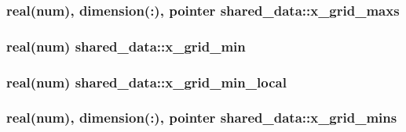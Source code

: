 \subsubsection[{\texorpdfstring{x\+\_\+grid\+\_\+maxs}{x_grid_maxs}}]{\setlength{\rightskip}{0pt plus 5cm}real(num), dimension(\+:), pointer shared\+\_\+data\+::x\+\_\+grid\+\_\+maxs}\hypertarget{namespaceshared__data_a486820ed6ed463bc8084e37890eb105e}{}\label{namespaceshared__data_a486820ed6ed463bc8084e37890eb105e}
\subsubsection[{\texorpdfstring{x\+\_\+grid\+\_\+min}{x_grid_min}}]{\setlength{\rightskip}{0pt plus 5cm}real(num) shared\+\_\+data\+::x\+\_\+grid\+\_\+min}\hypertarget{namespaceshared__data_a76d3dbdf07d1cb5aed88b436a613a6f6}{}\label{namespaceshared__data_a76d3dbdf07d1cb5aed88b436a613a6f6}
\subsubsection[{\texorpdfstring{x\+\_\+grid\+\_\+min\+\_\+local}{x_grid_min_local}}]{\setlength{\rightskip}{0pt plus 5cm}real(num) shared\+\_\+data\+::x\+\_\+grid\+\_\+min\+\_\+local}\hypertarget{namespaceshared__data_a12ab3a40a19df149a5d322939704a393}{}\label{namespaceshared__data_a12ab3a40a19df149a5d322939704a393}
\subsubsection[{\texorpdfstring{x\+\_\+grid\+\_\+mins}{x_grid_mins}}]{\setlength{\rightskip}{0pt plus 5cm}real(num), dimension(\+:), pointer shared\+\_\+data\+::x\+\_\+grid\+\_\+mins}\hypertarget{namespaceshared__data_ab595b2b077b3dd6067602742e089c333}{}\label{namespaceshared__data_ab595b2b077b3dd6067602742e089c333}
